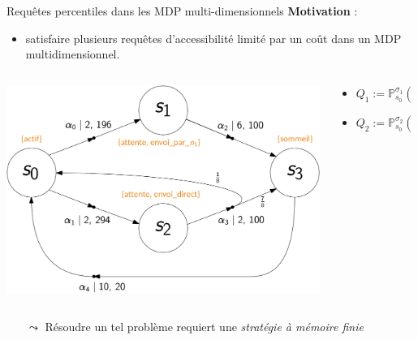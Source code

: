 \documentclass[compress]{beamer}
\theoremstyle{theorem}%
\begin{document}
\begin{frame}{Requêtes percentiles dans les MDP multi-dimensionnels}
  \textbf{\color{fibeamer@orange}Motivation} :
  \begin{itemize}
    \item satisfaire plusieurs requêtes d'accessibilité limité par un coût dans
      un MDP multidimensionnel.
  \end{itemize}
  \begin{center}
    \begin{columns}
      \begin{column}{0.4\linewidth}
        \includegraphics[width=\linewidth]{resources/mdmdp2}
      \end{column}
      \begin{column}{0.6\linewidth}{\small
        \begin{itemize}
          \item $Q_1 := \mathbb{P}^{\sigma_1}_{s_0}(\Diamond_{1\, :\, \leq 4} \text{ sommeil}) \geq 0.8$
          \item $Q_2 := \mathbb{P}^{\sigma_2}_{s_0}(\Diamond_{2\, :\, \leq 700} \text{ sommeil}) \geq 0.9$
        \end{itemize}
        }
      \end{column}
    \end{columns}
  \end{center}
  \begin{itemize}
    \item[$\leadsto$] Résoudre un tel problème requiert une \textit{\color{fibeamer@orange}stratégie à mémoire finie}
  \end{itemize}
\end{frame}
\end{document}
